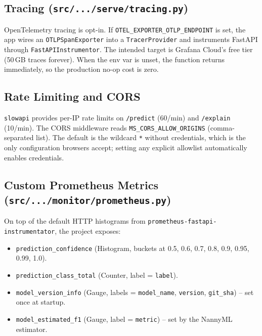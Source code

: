 \documentclass[11pt,a4paper]{article}
\begin{document}
\subsection{Tracing (\texttt{src/.../serve/tracing.py})}

OpenTelemetry tracing is opt-in. If \texttt{OTEL\_EXPORTER\_OTLP\_ENDPOINT} is set,
the app wires an \texttt{OTLPSpanExporter} into a \texttt{TracerProvider} and
instruments FastAPI through \texttt{FastAPIInstrumentor}. The intended target is
Grafana Cloud's free tier (50\,GB traces forever). When the env var is unset, the
function returns immediately, so the production no-op cost is zero.

\subsection{Rate Limiting and CORS}

\texttt{slowapi} provides per-IP rate limits on \texttt{/predict} (60/min) and
\texttt{/explain} (10/min). The CORS middleware reads
\texttt{MS\_CORS\_ALLOW\_ORIGINS} (comma-separated list). The default is the
wildcard \texttt{*} without credentials, which is the only configuration browsers
accept; setting any explicit allowlist automatically enables credentials.

\subsection{Custom Prometheus Metrics (\texttt{src/.../monitor/prometheus.py})}

On top of the default HTTP histograms from
\texttt{prometheus-fastapi-instrumentator}, the project exposes:

\begin{itemize}[leftmargin=*]
\item \texttt{prediction\_confidence} (Histogram, buckets at 0.5, 0.6, 0.7, 0.8,
      0.9, 0.95, 0.99, 1.0).
\item \texttt{prediction\_class\_total} (Counter, label = \texttt{label}).
\item \texttt{model\_version\_info} (Gauge, labels = \texttt{model\_name},
      \texttt{version}, \texttt{git\_sha}) -- set once at startup.
\item \texttt{model\_estimated\_f1} (Gauge, label = \texttt{metric}) -- set by the
      NannyML estimator.
\end{itemize}

\end{document}
